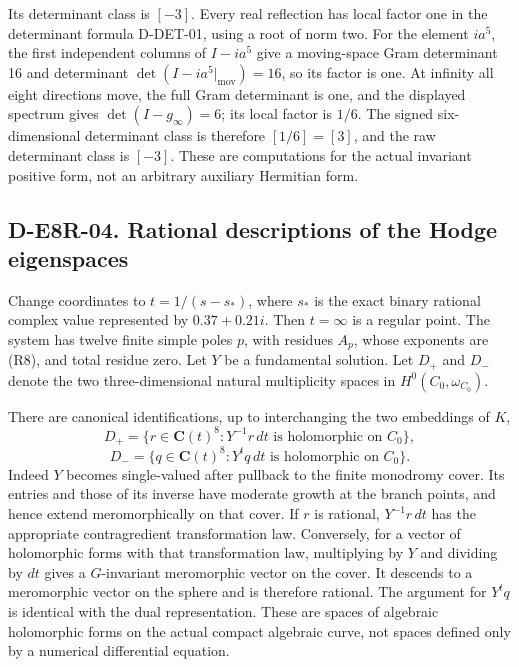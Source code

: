Its determinant class is $[-3]$. Every real reflection has local
factor one in the determinant formula D-DET-01, using a root of
norm two. For the element $ia^5$, the first independent columns of
$I-ia^5$ give a moving-space Gram determinant 16 and determinant
$\det(I-ia^5|_{\mathrm{mov}})=16$, so its factor is one. At infinity
all eight directions move, the full Gram determinant is one, and
the displayed spectrum gives $\det(I-g_\infty)=6$; its local factor
is $1/6$. The signed six-dimensional determinant class is therefore
$[1/6]=[3]$, and the raw determinant class is $[-3]$. These are
computations for the actual invariant positive form, not an arbitrary
auxiliary Hermitian form.

\subsection*{D-E8R-04. Rational descriptions of the Hodge eigenspaces}
Change coordinates to $t=1/(s-s_*)$, where $s_*$ is the exact
binary rational complex value represented by $0.37+0.21i$. Then
$t=\infty$ is a regular point. The system has twelve finite simple
poles $p$, with residues $A_p$, whose exponents are (R8), and total
residue zero. Let $Y$ be a fundamental solution. Let $D_+$ and
$D_-$ denote the two three-dimensional natural multiplicity spaces
in $H^0(C_0,\omega_{C_0})$.

There are canonical identifications, up to interchanging the two
embeddings of $K$,
\[
D_+=\{r\in\mathbf C(t)^8:Y^{-1}r\,dt
                        \text{ is holomorphic on }C_0\},
\]
\[
D_-=\{q\in\mathbf C(t)^8:Y^tq\,dt
                        \text{ is holomorphic on }C_0\}.
\tag{R9}
\]
Indeed $Y$ becomes single-valued after pullback to the finite
monodromy cover. Its entries and those of its inverse have moderate
growth at the branch points, and hence extend meromorphically on
that cover. If $r$ is rational, $Y^{-1}r\,dt$ has the appropriate
contragredient transformation law. Conversely, for a vector of
holomorphic forms with that transformation law, multiplying by $Y$
and dividing by $dt$ gives a $G$-invariant meromorphic vector on the
cover. It descends to a meromorphic vector on the sphere and is
therefore rational. The argument for $Y^tq$ is identical with the
dual representation. These are spaces of algebraic holomorphic
forms on the actual compact algebraic curve, not spaces defined only
by a numerical differential equation.

